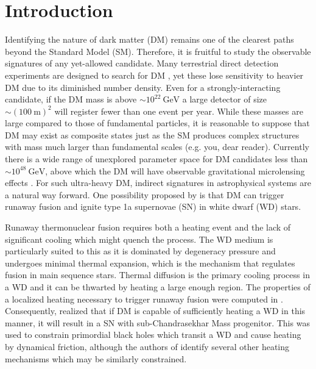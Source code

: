 \documentclass[preprintnumbers,amsmath,amssymb,prd, superscriptaddress,twocolumn]{revtex4}
\newcommand{\GeV}{\text{GeV}}
\begin{document}
\section{Introduction}
\label{sec:Introduction}

Identifying the nature of dark matter (DM) remains one of the clearest paths beyond the Standard Model (SM).
Therefore, it is fruitful to study the observable signatures of any yet-allowed candidate.
Many terrestrial direct detection experiments are designed to search for DM \cite{Akerib:2016vxi, Agnese:2017njq}, yet these lose sensitivity to heavier DM due to its diminished number density.
Even for a strongly-interacting candidate, if the DM mass is above $\sim 10^{22} ~\GeV$ a large detector of size $\sim (100 ~\text{m})^2$ will register fewer than one event per year.
While these masses are large compared to those of fundamental particles, it is reasonable to suppose that DM may exist as composite states just as the SM produces complex structures with mass much larger than fundamental scales (e.g. you, dear reader).
Currently there is a wide range of unexplored parameter space for DM candidates less than $\sim 10^{48} ~\GeV$, above which the DM will have observable gravitational microlensing effects \cite{Griest:2013aaa}.
For such ultra-heavy DM, indirect signatures in astrophysical systems are a natural way forward.
One possibility proposed by \cite{Graham:2015apa} is that DM can trigger runaway fusion and ignite type 1a supernovae (SN) in white dwarf (WD) stars.

Runaway thermonuclear fusion requires both a heating event and the lack of significant cooling which might quench the process.
The WD medium is particularly suited to this as it is dominated by degeneracy pressure and undergoes minimal thermal expansion, which is the mechanism that regulates fusion in main sequence stars.
Thermal diffusion is the primary cooling process in a WD and it can be thwarted by heating a large enough region.
The properties of a localized heating necessary to trigger runaway fusion were computed in \cite{Woosley}.
Consequently, \cite{Graham:2015apa} realized that if DM is capable of sufficiently heating a WD in this manner, it will result in a SN with sub-Chandrasekhar Mass progenitor.
This was used to constrain primordial black holes which transit a WD and cause heating by dynamical friction, although the authors of \cite{Graham:2015apa} identify several other heating mechanisms which may be similarly constrained.
\end{document}
